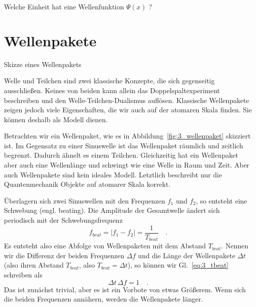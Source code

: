 \begin{questions}
    \item Welche Einheit hat eine Wellenfunktion $\Psi(x)$ ?
\end{questions}



\section{Wellenpakete}

\begin{marginfigure}
    \caption{Skizze eines Wellenpakets}
    \label{fig:3_wellenpaket}
\end{marginfigure}

Welle und Teilchen sind zwei klassische Konzepte, die sich gegenseitig ausschließen. Keines von beiden kann allein das Doppelspaltexperiment beschreiben und den Welle-Teilchen-Dualismus auflösen. Klassische Wellenpakete zeigen jedoch viele Eigenschaften, die wir auch auf der atomaren Skala finden. Sie können deshalb als Modell dienen.

Betrachten wir ein Wellenpaket, wie es in Abbildung~\ref{fig:3_wellenpaket} skizziert ist. Im Gegensatz zu einer Sinuswelle ist das Wellenpaket räumlich und zeitlich begrenzt. Dadurch ähnelt es einem Teilchen. Gleichzeitig hat ein Wellenpaket aber auch eine Wellenlänge und schwingt wie eine Welle in Raum und Zeit. Aber auch Wellenpakete sind kein ideales Modell. Letztlich beschreibt nur die Quantenmechanik Objekte auf atomarer Skala korrekt.

Überlagern sich zwei Sinuswellen mit den Frequenzen $f_1$ und $f_2$, so entsteht eine Schwebung (engl. beating). Die Amplitude der Gesamtwelle ändert sich periodisch mit der Schwebungsfrequenz
\begin{equation}
    f_{beat} = | f_1 - f_2 | = \frac{1}{T_{beat}} \quad . \label{eq:3_tbeat}
\end{equation}
Es entsteht also eine Abfolge von Wellenpaketen mit dem Abstand $T_{beat}$. Nennen wir die Differenz der beiden Frequenzen $\Delta f$ und die Länge der Wellenpakete $\Delta t$ (also ihren Abstand $T_{beat}$, also $T_{beat} = \Delta t$), so können wir Gl.~\ref{eq:3_tbeat} schreiben als
\begin{equation}
    \Delta t \, \Delta f = 1 \quad .
\end{equation}
Das ist zunächst trivial, aber es ist ein Vorbote von etwas Größerem. Wenn sich die beiden Frequenzen annähern, werden die Wellenpakete länger.



